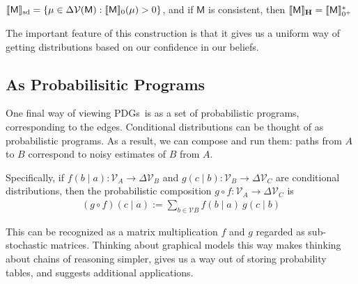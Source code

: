 \documentclass{article}
\newcommand\SD{_{\text{sd}}}
\newcommand\MaxEnt{_{\mathbf H}}
\newcommand{\V}{\mathcal V}
\newcommand{\sfM}{\mathsf M}
\newcommand{\MN}{PDG}
\newcommand{\MNs}{\MN s}
\numberwithin{equation}{section}
\begin{document}
\begin{notfocus}
{	\begin{prop}
		$\bbr{\sfM}\SD = \{ \mu \in \Delta \V(\sfM) : \bbr{\sfM}_0 (\mu) > 0 \}$, 
		and if $\sfM$ is consistent, then $\bbr{\sfM}\MaxEnt = \bbr{\sfM}_{0^+}^*$
	\end{prop}
	
	The important feature of this construction is that it gives us a uniform way of getting distributions based on our confidence in our beliefs.

	
	
	\begin{vfull}
	\subsection{As Probabilisitic Programs}\label{sec:prog-semantics}
	
	One final way of viewing \MNs\ is as a set of probabilistic programs, corresponding to the edges. 
	Conditional distributions can be thought of as probabilistic programs. As a result, we can compose and run them: paths from $A$ to $B$ correspond to noisy estimates of $B$ from $A$.
	
	Specifically, if $f(b \mid a) : \mathcal V_A \to \Delta \mathcal V_B$ and $g(c \mid b) : \mathcal V_B \to \Delta \mathcal V_C$ are conditional distributions, then the probabilistic composition $g\circ f : \mathcal V_A \to \Delta\mathcal V_C$ is
	\begin{align*}
		(g\circ  f) (c \mid a) :=  \sum_{b \in \mathcal V B}\!\! f (b \mid a)\ g(c \mid b)
	\end{align*}
	
	This can be recognized as a matrix multiplication $f$ and $g$ regarded as sub-stochastic matrices.
	Thinking about graphical models this way makes thinking about chains of reasoning simpler, gives us a way out of storing probability tables, and suggests additional applications.
	

\end{vfull}}
\end{notfocus}
\end{document}
